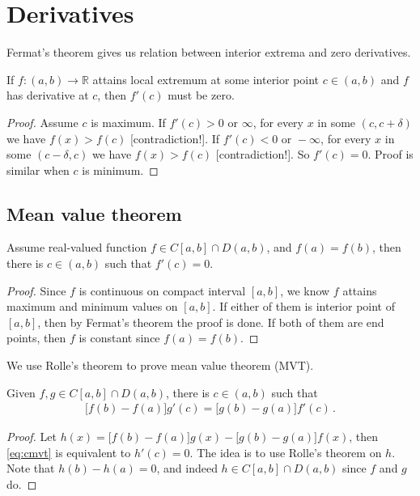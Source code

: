 \documentclass{article}
\newcommand{\R}{\mathbb R}
\begin{document}
\section{Derivatives}
Fermat's theorem gives us relation between interior extrema and zero derivatives.
\begin{theorem}
    If $ f : (a, b) \to \R $ attains local extremum at some interior point $ c \in (a, b) $ and $ f $ has derivative at $ c $, then $ f'(c) $ must be zero.
\end{theorem}

\begin{proof}
    Assume $ c $ is maximum. If $ f'(c) > 0 \text{ or } \infty $, for every $ x $ in some $ (c, c + \delta) $ we have $ f(x) > f(c) $ [contradiction!]. If $ f'(c) < 0 \text{ or } -\infty $, for every $ x $ in some $ (c - \delta, c) $ we have $ f(x) > f(c) $ [contradiction!]. So $ f'(c) = 0 $. Proof is similar when $ c $ is minimum.
\end{proof}

\subsection{Mean value theorem}
\begin{theorem}
    Assume real-valued function $ f \in C[a, b] \cap D(a, b) $, and $ f(a) = f(b) $, then there is $ c \in (a, b) $ such that $ f'(c) = 0 $.
\end{theorem}

\begin{proof}
    Since $ f $ is continuous on compact interval $ [a, b] $, we know $ f $ attains maximum and minimum values on $ [a, b] $. If either of them is interior point of $ [a, b] $, then by Fermat's theorem the proof is done. If both of them are end points, then $ f $ is constant since $ f(a) = f(b) $.
\end{proof}

We use Rolle's theorem to prove mean value theorem (MVT).
\begin{theorem}
    Given $ f, g \in C[a, b] \cap D(a, b) $, there is $ c \in (a, b) $ such that
    \begin{align} \label{eq:cmvt}
        \big[ f(b) - f(a) \big] g'(c) = \big[ g(b) - g(a) \big] f'(c)  \,.
    \end{align}
\end{theorem}
\begin{proof}
    Let $ h(x) = \big[ f(b) - f(a) \big] g(x) - \big[ g(b) - g(a) \big] f(x) $, then \eqref{eq:cmvt} is equivalent to $ h'(c) = 0 $. The idea is to use Rolle's theorem on $ h $. Note that $ h(b) - h(a) = 0 $, and indeed $ h \in C[a, b] \cap D(a, b) $ since $ f $ and $ g $ do.
\end{proof}
\end{document}
